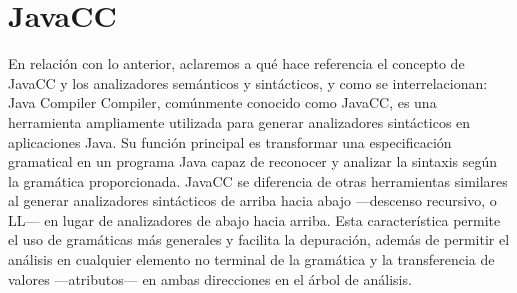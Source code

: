 

% 



% 




\section{JavaCC}
\noindent En relación con lo anterior, aclaremos a qué hace referencia el concepto de JavaCC y los analizadores semánticos y sintácticos, y como se interrelacionan:
Java Compiler Compiler, comúnmente conocido como JavaCC, es una herramienta ampliamente utilizada para generar analizadores sintácticos en aplicaciones Java. Su función principal es transformar una especificación gramatical en un programa Java capaz de reconocer y analizar la sintaxis según la gramática proporcionada.
JavaCC se diferencia de otras herramientas similares al generar analizadores sintácticos de arriba hacia abajo ---descenso recursivo, o LL--- en lugar de analizadores de abajo hacia arriba. Esta característica permite el uso de gramáticas más generales y facilita la depuración, además de permitir el análisis en cualquier elemento no terminal de la gramática y la transferencia de valores ---atributos--- en ambas direcciones en el árbol de análisis.

